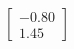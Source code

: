\documentclass[preview]{standalone}
\begin{document}
\begin{align*}
\begin{bmatrix} -0.80 \\ 1.45 \end{bmatrix}
\end{align*}
\end{document}
